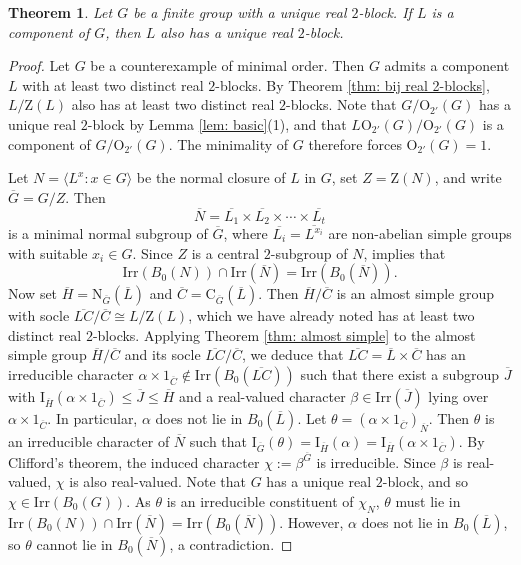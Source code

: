 \documentclass[10pt]{article}
\newtheorem{thm}[lem]{\bf Theorem}
\begin{document}
\begin{thm}\label{thm: reduction}
   Let $G$ be a finite group with a unique real $2$-block.
   If $L$ is a component of $G$,
   then $L$ also has a unique real $2$-block.
\end{thm}
\begin{proof}
  Let $G$ be a counterexample of minimal order.
  Then $G$ admits a component $L$
  with at least two distinct real $2$-blocks.
  By Theorem \ref{thm: bij real 2-blocks}, $L/\mathrm{Z}(L)$ also has at least two distinct real $2$-blocks.
  Note that $G/\mathrm{O}_{2'}(G)$ has a unique real $2$-block by Lemma \ref{lem: basic}(1),
  and that $L\mathrm{O}_{2'}(G)/\mathrm{O}_{2'}(G)$ is a component of $G/\mathrm{O}_{2'}(G)$.
  The minimality of $G$ therefore forces $\mathrm{O}_{2'}(G) = 1$.
  
  Let $N=\langle L^{x}:x\in G\rangle$ be the normal closure of $L$ in $G$, set $Z = \mathrm{Z}(N)$, and write $\overline{G} = G/Z$.
  Then 
  \[
\overline{N} = \overline{L_1} \times \overline{L_2} \times \cdots \times \overline{L_t}
\]
  is a minimal normal subgroup of $\overline{G}$,
  where $\overline{L_i}=\overline{L^{x_i}}$ are non-abelian simple groups with suitable $x_i\in G$.
  Since $Z$ is a central $2$-subgroup of $N$,
  \cite[Theorem 9.10]{navarro98}
  implies that
  $$\mathrm{Irr}(B_0(N))\cap \mathrm{Irr}(\overline{N})=\mathrm{Irr}(B_0(\overline{N})).$$
  Now set $\overline{H}=\mathrm{N}_{\overline{G}}(\overline{L})$ and $\overline{C}=\mathrm{C}_{\overline{G}}(\overline{L})$.
  Then $\overline{H}/\overline{C}$ is an almost simple group with socle $\overline{LC}/\overline{C} \cong L/\mathrm{Z}(L)$, which we have already noted has at least two distinct real $2$-blocks.
  Applying Theorem \ref{thm: almost simple} to the almost simple group $\overline{H}/\overline{C}$ and its socle $\overline{LC}/\overline{C}$,
  we deduce that $\overline{LC}=\overline{L}\times \overline{C}$ has an irreducible character $\alpha\times 1_{\overline{C}}\notin \mathrm{Irr}(B_0(\overline{LC}))$
  such that 
  there exist a subgroup $\overline{J}$ with $\mathrm{I}_{\overline{H}}(\alpha\times 1_{\overline{C}})\leq \overline{J}\leq \overline{H}$ 
  and a real-valued character $\beta\in \mathrm{Irr}(\overline{J})$ lying over $\alpha\times 1_{\overline{C}}$.
  In particular, $\alpha$ does not lie in $B_0(\overline{L})$.
  Let $\theta=(\alpha\times 1_{\overline{C}})_{\overline{N}}$.
  Then $\theta$ is an irreducible character of $\overline{N}$
  such that
  $\mathrm{I}_{\overline{G}}(\theta)=\mathrm{I}_{\overline{H}}(\alpha)=\mathrm{I}_{\overline{H}}(\alpha\times 1_{\overline{C}})$.
  By Clifford's theorem, the induced character $\chi:=\beta^{\overline{G}}$ is irreducible.
  Since $\beta$ is real-valued, $\chi$ is also real-valued.
  Note that $G$ has a unique real $2$-block, and so $\chi\in \mathrm{Irr}(B_0(G))$.
  As $\theta$ is an irreducible constituent of $\chi_N$, $\theta$ must lie in $\mathrm{Irr}(B_0(N))\cap \mathrm{Irr}(\overline{N})=\mathrm{Irr}(B_0(\overline{N}))$. 
  However, $\alpha$ does not lie in $B_0(\overline{L})$, so $\theta$ cannot lie in $B_0(\overline{N})$, a contradiction.
\end{proof}
\end{document}
